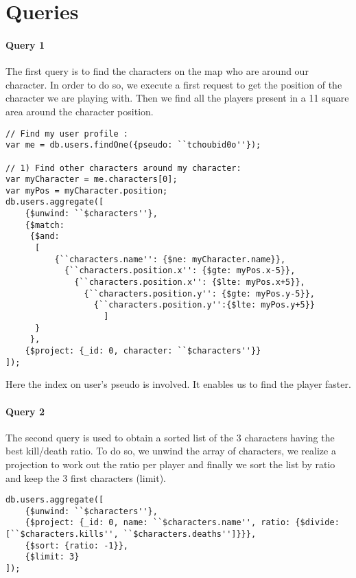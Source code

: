 \documentclass[a4paper, 11pt]{article}
\begin{document}
\section{Queries}
\paragraph*{Query 1\\}
The first query is to find the characters on the map who are around our character. In order to do so, we execute a first request to get the position of the character we are playing with. Then we find all the players present in a 11 square area around the character position.

\begin{lstlisting}
// Find my user profile : 
var me = db.users.findOne({pseudo: ``tchoubid0o''});

// 1) Find other characters around my character:
var myCharacter = me.characters[0];
var myPos = myCharacter.position;
db.users.aggregate([
    {$unwind: ``$characters''}, 
    {$match: 
     {$and: 
      [
          {``characters.name'': {$ne: myCharacter.name}},
            {``characters.position.x'': {$gte: myPos.x-5}}, 
              {``characters.position.x'': {$lte: myPos.x+5}}, 
                {``characters.position.y'': {$gte: myPos.y-5}}, 
                  {``characters.position.y'':{$lte: myPos.y+5}}
                    ]
      }
     },
    {$project: {_id: 0, character: ``$characters''}}
]);
\end{lstlisting}

Here the index on user's pseudo is involved. It enables us to find the player faster.

\paragraph*{Query 2\\}
The second query is used to obtain a sorted list of the 3 characters having the best kill/death ratio. To do so, we unwind the array of characters, we realize a projection to work out the ratio per player and finally we sort the list by ratio and keep the 3 first characters (limit).

\begin{lstlisting}
db.users.aggregate([
    {$unwind: ``$characters''}, 
    {$project: {_id: 0, name: ``$characters.name'', ratio: {$divide: [``$characters.kills'', ``$characters.deaths'']}}},
    {$sort: {ratio: -1}},
    {$limit: 3}
]);
\end{lstlisting}
\end{document}
